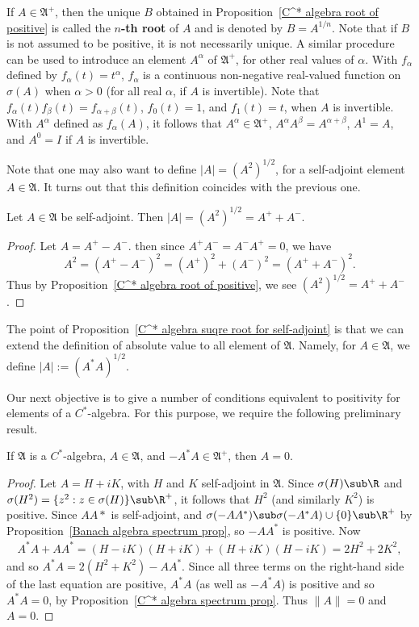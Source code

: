 If $A\in\mathfrak{A}^+$, then the unique $B$ obtained in Proposition~\ref{C^* algebra root of positive} is called the \textbf{$n$-th root} of $A$ and is denoted by $B=A^{1/n}$. Note that if $B$ is not assumed to be positive, it is not necessarily unique. A similar procedure can be used to introduce an element $A^\alpha$ of $\mathfrak{A}^+$, for other real values of $\alpha$. With $f_\alpha$ defined by $f_\alpha(t)=t^\alpha$, $f_\alpha$ is a continuous non-negative real-valued function on $\sigma(A)$ when $\alpha>0$ (for all real $\alpha$, if $A$ is invertible). Note that $f_\alpha(t)f_\beta(t)=f_{\alpha+\beta}(t)$, $f_0(t)=1$, and $f_1(t)=t$, when $A$ is invertible. With $A^\alpha$ defined as $f_\alpha(A)$, it follows that $A^\alpha\in\mathfrak{A}^+$, $A^{\alpha}A^\beta=A^{\alpha+\beta}$, $A^1=A$, and $A^0=I$ if $A$ is invertible.\par
Note that one may also want to define $|A|=(A^2)^{1/2}$, for a self-adjoint element $A\in\mathfrak{A}$. It turns out that this definition coincides with the previous one.
\begin{proposition}\label{C^* algebra suqre root for self-adjoint}
Let $A\in\mathfrak{A}$ be self-adjoint. Then $|A|=(A^2)^{1/2}=A^++A^-$.
\end{proposition}
\begin{proof}
Let $A=A^+-A^-$. then since $A^+A^-=A^-A^+=0$, we have
\[A^2=(A^+-A^-)^2=(A^+)^2+(A^-)^2=(A^++A^-)^2.\]
Thus by Proposition~\ref{C^* algebra root of positive}, we see $(A^2)^{1/2}=A^++A^-$.
\end{proof}
The point of Proposition~\ref{C^* algebra suqre root for self-adjoint} is that we can extend the definition of absolute value to all element of $\mathfrak{A}$. Namely, for $A\in\mathfrak{A}$, we define $|A|:=(A^*A)^{1/2}$.\par
Our next objective is to give a number of conditions equivalent to positivity for elements of a $C^*$-algebra. For this purpose, we require the following preliminary result.
\begin{lemma}\label{C^* algebra A^*A negative iff A=0}
If $\mathfrak{A}$ is a $C^*$-algebra, $A\in\mathfrak{A}$, and $-A^*A\in\mathfrak{A}^+$, then $A=0$.
\end{lemma}
\begin{proof}
Let $A=H+iK$, with $H$ and $K$ self-adjoint in $\mathfrak{A}$. Since $\sigma(H)\sub\R$ and $\sigma(H^2)=\{z^2:z\in\sigma(H)\}\sub\R^+$, it follows that $H^2$ (and similarly $K^2$) is positive. Since $AA*$ is self-adjoint, and $\sigma(-AA^*)\sub\sigma(-A^*A)\cup\{0\}\sub\R^+$ by Proposition~\ref{Banach algebra spectrum prop}, so $-AA^*$ is positive. Now
\begin{align*}
A^*A+AA^*=(H-iK)(H+iK)+(H+iK)(H-iK)=2H^2+2K^2,
\end{align*}
and so $A^*A=2(H^2+K^2)-AA^*$. Since all three terms on the right-hand side of the last equation are positive, $A^*A$ (as well as $-A^*A$) is positive and so $A^*A=0$, by Proposition~\ref{C^* algebra spectrum prop}. Thus $\|A\|=0$ and $A=0$.
\end{proof}
